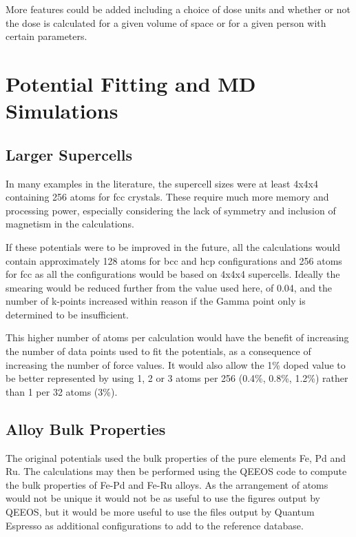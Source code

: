 More features could be added including a choice of dose units and whether or not the dose is calculated for a given volume of space or for a given person with certain parameters.



\section{Potential Fitting and MD Simulations}

\subsection{Larger Supercells}

In many examples in the literature, the supercell sizes were at least 4x4x4 containing 256 atoms for \acrshort{fcc} crystals.  These require much more memory and processing power, especially considering the lack of symmetry and inclusion of magnetism in the calculations.  

If these potentials were to be improved in the future, all the calculations would contain approximately 128 atoms for \acrshort{bcc} and \acrshort{hcp} configurations and 256 atoms for \acrshort{fcc} as all the configurations would be based on 4x4x4 supercells.  Ideally the smearing would be reduced further from the value used here, of 0.04, and the number of k-points increased within reason if the Gamma point only is determined to be insufficient.

This higher number of atoms per calculation would have the benefit of increasing the number of data points used to fit the potentials, as a consequence of increasing the number of force values.  It would also allow the 1\% doped value to be better represented by using 1, 2 or 3 atoms per 256 (0.4\%, 0.8\%, 1.2\%) rather than 1 per 32 atoms (3\%).

\subsection{Alloy Bulk Properties}

The original potentials used the bulk properties of the pure elements Fe, Pd and Ru.  The calculations may then be performed using the QEEOS code to compute the bulk properties of Fe-Pd and Fe-Ru alloys.  As the arrangement of atoms would not be unique it would not be as useful to use the figures output by QEEOS, but it would be more useful to use the files output by Quantum Espresso as additional configurations to add to the reference database. 


